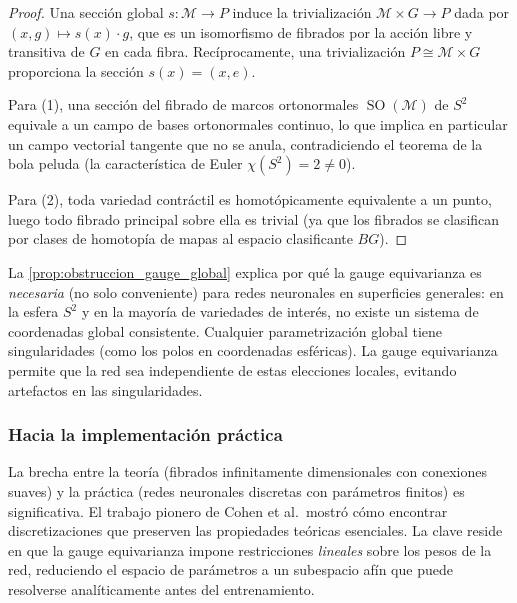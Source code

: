 \begin{proof}
Una sección global $s: \mathcal{M} \to P$ induce la trivialización $\mathcal{M} \times G \to P$ dada por $(x, g) \mapsto s(x) \cdot g$, que es un isomorfismo de fibrados por la acción libre y transitiva de $G$ en cada fibra. Recíprocamente, una trivialización $P \cong \mathcal{M} \times G$ proporciona la sección $s(x) = (x, e)$.

Para (1), una sección del fibrado de marcos ortonormales $\operatorname{SO}(\mathcal{M})$ de $S^2$ equivale a un campo de bases ortonormales continuo, lo que implica en particular un campo vectorial tangente que no se anula, contradiciendo el teorema de la bola peluda (la característica de Euler $\chi(S^2) = 2 \neq 0$).

Para (2), toda variedad contráctil es homotópicamente equivalente a un punto, luego todo fibrado principal sobre ella es trivial (ya que los fibrados se clasifican por clases de homotopía de mapas al espacio clasificante $BG$).
\end{proof}

\begin{remark}
La \autoref{prop:obstruccion_gauge_global} explica por qué la gauge equivarianza es \textit{necesaria} (no solo conveniente) para redes neuronales en superficies generales: en la esfera $S^2$ y en la mayoría de variedades de interés, no existe un sistema de coordenadas global consistente. Cualquier parametrización global tiene singularidades (como los polos en coordenadas esféricas). La gauge equivarianza permite que la red sea independiente de estas elecciones locales, evitando artefactos en las singularidades.
\end{remark}

\subsubsection{Hacia la implementación práctica}

La brecha entre la teoría (fibrados infinitamente dimensionales con conexiones suaves) y la práctica (redes neuronales discretas con parámetros finitos) es significativa. El trabajo pionero de Cohen et al.\ mostró cómo encontrar discretizaciones que preserven las propiedades teóricas esenciales. La clave reside en que la gauge equivarianza impone restricciones \textit{lineales} sobre los pesos de la red, reduciendo el espacio de parámetros a un subespacio afín que puede resolverse analíticamente antes del entrenamiento.

